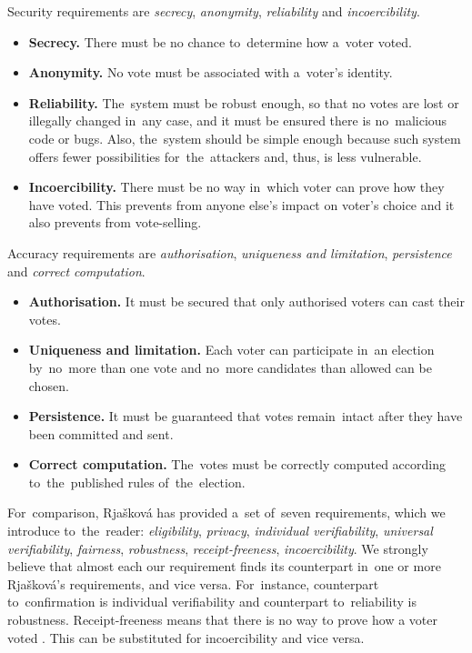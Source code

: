 Security requirements are \emph{secrecy}, \emph{anonymity}, \emph{reliability} and \emph{incoercibility}.
\begin{itemize}
\item \textbf{Secrecy.} There must be no chance to~determine how a~voter voted.
\item \textbf{Anonymity.} No vote must be associated with a~voter's identity.
\item \textbf{Reliability.} The~system must be robust enough, so that no votes are lost or illegally changed in~any case, and it must be ensured there is no~malicious code or bugs. Also, the~system should be simple enough because such system offers fewer possibilities for~the~attackers and, thus, is less vulnerable.
\item \textbf{Incoercibility.} There must be no way in~which voter can prove how they have voted. This prevents from anyone else's impact on voter's choice and it also prevents from vote-selling.
\end{itemize}

Accuracy requirements are \emph{authorisation}, \emph{uniqueness and limitation}, \emph{persistence} and \emph{correct computation}.

\begin{itemize}
\item \textbf{Authorisation.} It must be secured that only authorised voters can cast their votes.
\item \textbf{Uniqueness and limitation.}  Each voter can participate in~an election by~no~more than one vote and no~more candidates than allowed can be chosen.
\item \textbf{Persistence.} It must be guaranteed that votes remain~intact after they have been committed and sent.
\item \textbf{Correct computation.} The~votes must be correctly computed according to~the~published rules of~the~election.
\end{itemize}
For~comparison, Rjašková \cite{Rjaskova} has provided a~set of~seven requirements, which we introduce to~the~reader: \emph{eligibility}, \emph{privacy}, \emph{individual verifiability}, \emph{universal verifiability}, \emph{fairness}, \emph{robustness}, \emph{receipt-freeness}, \emph{incoercibility}. We strongly believe that almost each our requirement finds its counterpart in~one or more Rjašková's requirements, and vice versa. For~instance, counterpart to~confirmation is individual verifiability and counterpart to~reliability is robustness. Receipt-freeness means that there is no way to prove how a voter voted \cite{Delaune}. This can be substituted for incoercibility and vice versa.

